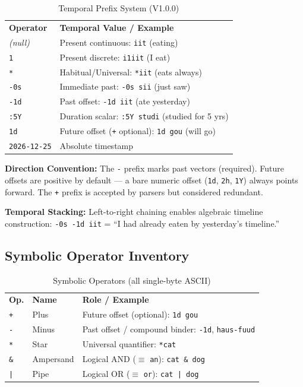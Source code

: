 \documentclass[12pt,onecolumn,letterpaper]{article}
\newcommand{\me}[1]{\texttt{#1}}
\newcommand{\MEtablelayout}{%
\footnotesize
\setlength{\tabcolsep}{6pt}%
\renewcommand{\arraystretch}{1.12}%
\arrayrulecolor{MERule}%
}
\begin{document}
\begin{table}[h!]
\centering
\MEtablelayout
\begin{tabularx}{\linewidth}{lX}
\rowcolor{MEGray}
\textbf{Operator} & \textbf{Temporal Value / Example} \\
\textit{(null)} & Present continuous: \me{iit} (eating) \\
\me{1}          & Present discrete: \me{i1iit} (I eat) \\
\me{*}          & Habitual/Universal: \me{*iit} (eats always) \\
\me{-0s}        & Immediate past: \me{-0s sii} (just saw) \\
\me{-1d}        & Past offset: \me{-1d iit} (ate yesterday) \\
\me{:5Y}        & Duration scalar: \me{:5Y studi} (studied for 5 yrs) \\
\me{1d}         & Future offset (\me{+} optional): \me{1d gou} (will go) \\
\me{2026-12-25} & Absolute timestamp \\
\bottomrule
\end{tabularx}
\caption{Temporal Prefix System (V1.0.0)}
\end{table}

\textbf{Direction Convention:} The \me{-} prefix marks past vectors
(required). Future offsets are positive by default --- a bare numeric offset
(\me{1d}, \me{2h}, \me{1Y}) always points forward. The \me{+} prefix is
accepted by parsers but considered redundant.

\textbf{Temporal Stacking:} Left-to-right chaining enables algebraic
timeline construction: \me{-0s -1d iit} = ``I had already eaten by
yesterday's timeline.''

\subsection{Symbolic Operator Inventory}

\begin{table}[h!]
\centering
\MEtablelayout
\begin{tabularx}{\linewidth}{llX}
\rowcolor{MEGray}
\textbf{Op.} & \textbf{Name} & \textbf{Role / Example} \\
\me{+}  & Plus      & Future offset (optional): \me{1d gou} \\
\me{-}  & Minus     & Past offset / compound binder: \me{-1d}, \me{haus-fuud} \\
\me{*}  & Star      & Universal quantifier: \me{*cat} \\
\me{\&} & Ampersand & Logical AND ($\equiv$ \me{an}): \me{cat \& dog} \\
\me{|}  & Pipe      & Logical OR ($\equiv$ \me{or}): \me{cat | dog} \\
\bottomrule
\end{tabularx}
\caption{Symbolic Operators (all single-byte ASCII)}
\end{table}
\end{document}
